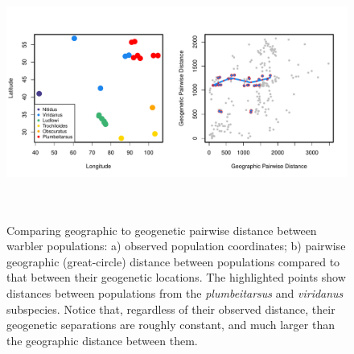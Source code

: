 \documentclass[12pt]{article}
\begin{document}
\begin{figure}
\centering
	{\includegraphics[width=6in,height=3in]{figs/warblers/warb_pop_dist_compare.pdf}}
	\caption{
    Comparing geographic to geogenetic pairwise distance between warbler populations: a) observed population coordinates; b) pairwise geographic (great-circle) distance between populations compared to that between their geogenetic locations.  The highlighted points show distances between populations from the \textit{plumbeitarsus} and \textit{viridanus} subspecies.  Notice that, regardless of their observed distance, their geogenetic separations are roughly constant, and much larger than the geographic distance between them.
    }
	\label{sfig:warb_pop_distcomp}
\end{figure}
\end{document}

